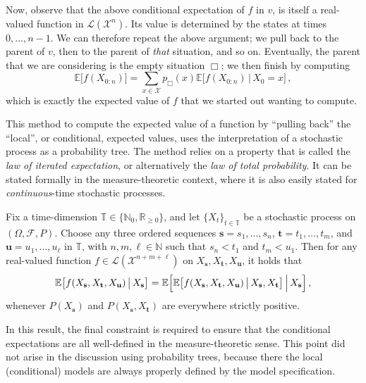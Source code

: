 \documentclass[graybox]{svmult}
\newcommand{\nats}{\mathbb{N}}
\newcommand{\natswith}{\nats_{0}}
\newcommand{\reals}{\mathbb{R}}
\newcommand{\realsnonneg}{\reals_{\geq 0}}
\newcommand{\states}{\mathcal{X}}
\newcommand{\gambles}{\mathcal{L}}
\newcommand{\timedim}{\mathbb{T}}
\begin{document}
Now, observe that the above conditional expectation of $f$ in $v$, is itself a real-valued function in $\gambles(\states^n)$. Its value is determined by the states at times $0,\ldots,n-1$. We can therefore repeat the above argument; we pull back to the parent of $v$, then to the parent of \emph{that} situation, and so on. Eventually, the parent that we are considering is the empty situation $\Box$; we then finish by computing
\begin{equation*}
\mathbb{E}\bigl[f(X_{0:n})\bigr] = \sum_{x\in\states} p_\Box(x) \mathbb{E}\bigl[f(X_{0:n})\,\big\vert\,X_0=x\bigr]\,,
\end{equation*}
which is exactly the expected value of $f$ that we started out wanting to compute.

This method to compute the expected value of a function by ``pulling back'' the ``local'', or conditional, expected values, uses the interpretation of a stochastic process as a probability tree. The method relies on a property that is called the \emph{law of iterated expectation}, or alternatively the \emph{law of total probability}. It can be stated formally in the measure-theoretic context, where it is also easily stated for \emph{continuous}-time stochastic processes.
\begin{theorem}\label{thm:loie}
Fix a time-dimension $\timedim\in\{\natswith,\realsnonneg\}$, and let $\{X_t\}_{t\in\timedim}$ be a stochastic process on $(\Omega,\mathcal{F},P)$. Choose any three ordered sequences $\mathbf{s}=s_1,\ldots,s_n$, $\mathbf{t}=t_1,\ldots,t_m$, and $\mathbf{u}=u_1,\ldots,u_\ell$ in $\timedim$, with $n,m,\ell\in\nats$ such that $s_n<t_1$ and $t_m<u_1$. Then for any real-valued function $f\in\gambles(\states^{n+m+\ell})$ on $X_\mathbf{s},X_\mathbf{t},X_\mathbf{u}$, it holds that
\begin{equation*}
\mathbb{E}\bigl[f(X_\mathbf{s},X_\mathbf{t},X_\mathbf{u})\,\big\vert\,X_\mathbf{s}\bigr] = \mathbb{E}\Bigl[\mathbb{E}\bigl[f(X_\mathbf{s},X_\mathbf{t},X_\mathbf{u})\,\big\vert\,X_\mathbf{s},X_\mathbf{t}\bigr]\,\Big\vert\,X_\mathbf{s}\Bigr]\,,
\end{equation*} 
whenever $P(X_\mathbf{s})$ and $P(X_\mathbf{s},X_\mathbf{t})$ are everywhere strictly positive.
\end{theorem}
In this result, the final constraint is required to ensure that the conditional expectations are all well-defined in the measure-theoretic sense. This point did not arise in the discussion using probability trees, because there the local (conditional) models are always properly defined by the model specification.
\end{document}
